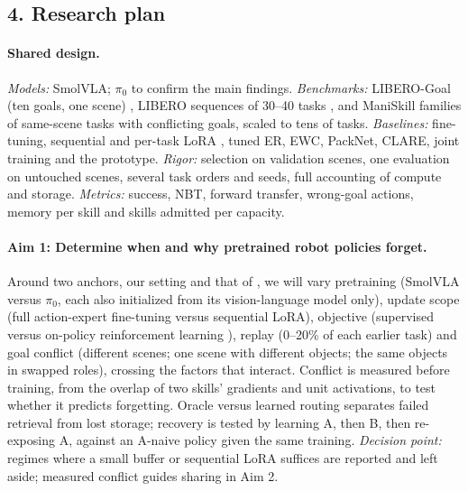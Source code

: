\documentclass[11pt]{article}
\begin{document}
\subsection*{4. Research plan}
\paragraph{Shared design.} \emph{Models:} SmolVLA; $\pi_0$ \citep{black2024pi0} to confirm the main findings.
\emph{Benchmarks:} LIBERO-Goal (ten goals, one scene) \citep{liu2023libero}, LIBERO sequences of 30--40 tasks
\citep{hu2026simple,romer2026clare}, and ManiSkill families of same-scene tasks with conflicting goals, scaled to tens
of tasks. \emph{Baselines:} fine-tuning, sequential and per-task LoRA \citep{liu2024tail}, tuned ER, EWC,
PackNet, CLARE, joint training and the prototype. \emph{Rigor:} selection on validation scenes, one evaluation on
untouched scenes, several task orders and seeds, full accounting of compute and storage. \emph{Metrics:} success, NBT, forward transfer, wrong-goal actions, memory per skill and skills admitted per capacity.

\paragraph{Aim 1: Determine when and why pretrained robot policies forget.} Around two anchors, our setting and that of
\citet{liu2026pretrained}, we will vary pretraining (SmolVLA versus $\pi_0$, each also initialized from its
vision-language model only), update scope (full action-expert fine-tuning versus sequential LoRA), objective (supervised
versus on-policy reinforcement learning \citep{hu2026simple}), replay (0--20\% of each earlier task) and goal conflict
(different scenes; one scene with different objects; the same objects in swapped roles), crossing the factors that
interact. Conflict is measured before training, from the overlap of two skills' gradients and unit activations, to test
whether it predicts forgetting. Oracle versus learned routing separates failed retrieval from lost storage; recovery is
tested by learning A, then B, then re-exposing A, against an A-naive policy given the same training. \emph{Decision point:} regimes where a small buffer or sequential LoRA suffices are reported and left aside; measured
conflict guides sharing in Aim 2.
\end{document}
